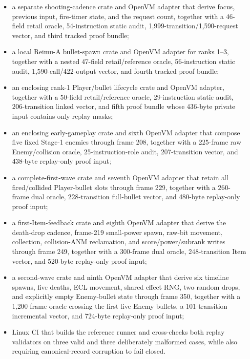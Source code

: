 \begin{itemize}
  public-digest inspection, and one-bit-negative commitment/digest checks;
  \item a separate shooting-cadence crate and OpenVM adapter that derive focus,
  previous input, fire-timer state, and the  request count,
  together with a 46-field retail oracle, 54-instruction static audit,
  1,999-transition/1,590-request vector, and third tracked proof bundle;
  \item a local Reimu-A bullet-spawn crate and OpenVM adapter for ranks 1--3,
  together with a nested 47-field retail/reference oracle, 56-instruction
  static audit, 1,590-call/422-output vector, and fourth tracked proof bundle;
  \item an enclosing rank-1 Player/bullet lifecycle crate and OpenVM adapter,
  together with a 50-field retail/reference oracle, 29-instruction static
  audit, 206-transition linked vector, and fifth proof bundle whose 436-byte
  private input contains only replay masks;
  \item an enclosing early-gameplay crate and sixth OpenVM adapter that compose
  five fixed Stage-1 enemies through frame 208, together with a 225-frame raw
  Enemy/collision oracle, 25-instruction-role audit, 207-transition vector, and
  438-byte replay-only proof input;
  \item a complete-first-wave crate and seventh OpenVM adapter that retain all
  fired/collided Player-bullet slots through frame 229, together with a
  260-frame dual oracle, 228-transition full-bullet vector, and 480-byte
  replay-only proof input;
  \item a first-Item-feedback crate and eighth OpenVM adapter that derive the
  death-drop cadence, frame-219 small-power spawn, raw-bit movement, collection,
  collision-ANM reclamation, and score/power/subrank writes through frame 249,
  together with a 300-frame dual oracle, 248-transition Item vector, and
  520-byte replay-only proof input;
  \item a second-wave crate and ninth OpenVM adapter that derive six timeline
  spawns, five deaths, ECL movement, shared effect RNG, two random drops, and
  explicitly empty Enemy-bullet state through frame 350, together with a
  1,200-frame oracle crossing the first live Enemy bullets, a 101-transition
  incremental vector, and 724-byte replay-only proof input;
  \item Linux CI that builds the reference runner and cross-checks both replay
  validators on three valid and three deliberately malformed cases, while also
  requiring canonical-record corruption to fail closed.
\end{itemize}

